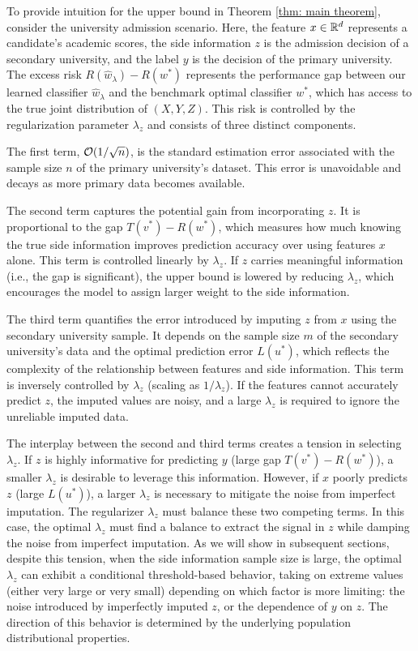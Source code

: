 To provide intuition for the upper bound in Theorem \ref{thm: main theorem}, consider the university admission scenario. Here, the feature $x \in \mathbb{R}^d$ represents a candidate's academic scores, the side information $z$ is the admission decision of a secondary university, and the label $y$ is the decision of the primary university. The excess risk $R(\hat{w}_{\lambda}) - R(w^*)$ represents the performance gap between our learned classifier $\hat{w}_{\lambda}$ and the benchmark optimal classifier $w^*$, which has access to the true joint distribution of $(X, Y, Z)$. This risk is controlled by the regularization parameter $\lambda_z$ and consists of three distinct components.

The first term, $\mathcal{O}(1/\sqrt{n})$, is the standard estimation error associated with the sample size $n$ of the primary university's dataset. This error is unavoidable and decays as more primary data becomes available.

The second term captures the potential gain from incorporating $z$. It is proportional to the gap $T(v^*) - R(w^*)$, which measures how much knowing the true side information improves prediction accuracy over using features $x$ alone. This term is controlled linearly by $\lambda_z$. If $z$ carries meaningful information (i.e., the gap is significant), the upper bound is lowered by reducing $\lambda_z$, which encourages the model to assign larger weight to the side information.

The third term quantifies the error introduced by imputing $z$ from $x$ using the secondary university sample. It depends on the sample size $m$ of the secondary university's data and the optimal prediction error $L(u^*)$, which reflects the complexity of the relationship between features and side information. This term is inversely controlled by $\lambda_z$ (scaling as $1/\lambda_z$). If the features cannot accurately predict $z$, the imputed values are noisy, and a large $\lambda_z$ is required to ignore the unreliable imputed data.

The interplay between the second and third terms creates a tension in selecting $\lambda_z$. If $z$ is highly informative for predicting $y$ (large gap $T(v^*) - R(w^*)$), a smaller $\lambda_z$ is desirable to leverage this information. However, if $x$ poorly predicts $z$ (large $L(u^*)$), a larger $\lambda_z$ is necessary to mitigate the noise from imperfect imputation. The regularizer $\lambda_z$ must balance these two competing terms. In this case, the optimal $\lambda_z$ must find a balance to extract the signal in $z$ while damping the noise from imperfect imputation. As we will show in subsequent sections, despite this tension, when the side information sample size is large, the optimal $\lambda_z$ can exhibit a conditional threshold-based behavior, taking on extreme values (either very large or very small) depending on which factor is more limiting: the noise introduced by imperfectly imputed $z$, or the dependence of $y$ on $z$. The direction of this behavior is determined by the underlying population distributional properties.

